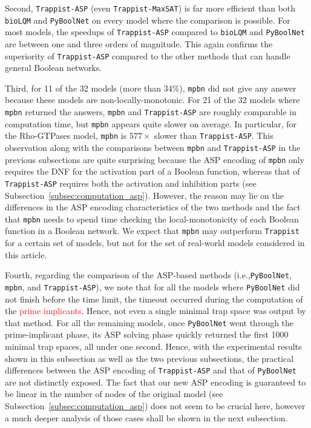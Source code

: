 \documentclass[preprint,12pt]{elsarticle}
\newcommand{\change}[1]{\textcolor{red}{#1}}
\begin{document}
Second, \texttt{Trappist-ASP} (even \texttt{Trappist-MaxSAT}) is far more efficient than both \texttt{bioLQM} and \texttt{PyBoolNet} on every model where the comparison is possible.
For most models, the speedups of \texttt{Trappist-ASP} compared to \texttt{bioLQM} and \texttt{PyBoolNet} are between one and three orders of magnitude.
This again confirms the superiority of \texttt{Trappist-ASP} compared to the other methods that can handle general Boolean networks.

Third, for 11 of the 32 models (more than 34\%), \texttt{mpbn} did not give any answer because these models are non-locally-monotonic.
For 21 of the 32 models where \texttt{mpbn} returned the answers, \texttt{mpbn} and \texttt{Trappist-ASP} are roughly comparable in computation time, but \texttt{mpbn} appears quite slower on average.
In particular, for the Rho-GTPases model, \texttt{mpbn} is \(577\times\) slower than \texttt{Trappist-ASP}.
This observation along with the comparisons between \texttt{mpbn} and \texttt{Trappist-ASP} in the previous subsections are quite surprising because the ASP encoding of \texttt{mpbn} only requires the DNF for the activation part of a Boolean function, whereas that of \texttt{Trappist-ASP} requires both the activation and inhibition parts (see Subsection~\ref{subsec:computation_asp}).
However, the reason may lie on the differences in the ASP encoding characteristics of the two methods and the fact that \texttt{mpbn} needs to spend time checking the local-monotonicity of each Boolean function in a Boolean network.
We expect that \texttt{mpbn} may outperform \texttt{Trappist} for a certain set of models, but not for the set of real-world models considered in this article.

Fourth, regarding the comparison of the ASP-based methods (i.e.,\linebreak \texttt{PyBoolNet}, \texttt{mpbn}, and \texttt{Trappist-ASP}), we note that for all the models where \texttt{PyBoolNet} did not finish before the time limit, the timeout occurred during the computation of the \change{prime implicants}.
Hence, not even a single minimal trap space was output by that method.
For all the remaining models, once \texttt{PyBoolNet} went through the prime-implicant phase, its ASP solving phase quickly returned the first 1000 minimal trap spaces, all under one second.
Hence, with the experimental results shown in this subsection as well as the two previous subsections, the practical differences between the ASP encoding of \texttt{Trappist-ASP} and that of \texttt{PyBoolNet} are not distinctly exposed.
The fact that our new ASP encoding is guaranteed to be linear in the number of nodes of the original model (see Subsection~\ref{subsec:computation_asp}) does not seem to be crucial here, however a much deeper analysis of those cases shall be shown in the next subsection.
\end{document}
